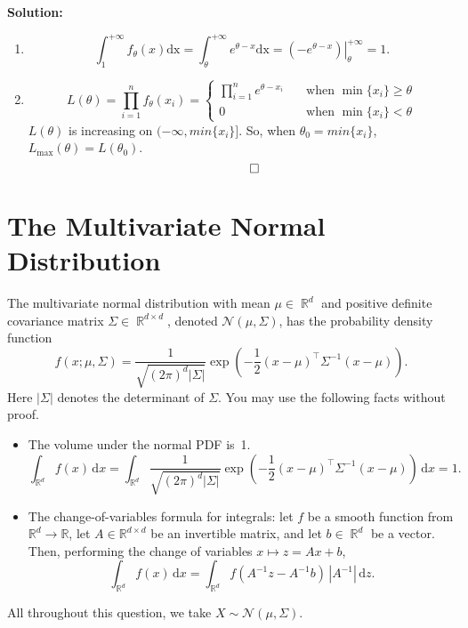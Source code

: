 \documentclass{article}
\newcommand{\Question}[1]{\Large \section{ #1 } \normalsize}
\DeclareMathOperator{\R}{\mathbb{R}}
\newenvironment{solution}{\color{blue} \smallskip \textbf{Solution:}}{}
\begin{document}
\begin{enumerate}
    \begin{solution}
        \begin{enumerate}
            \item 
            $$
            \int_{1}^{+\infty} f_{\theta}(x) \mathrm{dx} = \int_{\theta}^{+\infty} e^{\theta - x} \mathrm{dx} = \left. (-e^{\theta - x}) \right| _{\theta}^{+\infty}=1.
            $$
            \item
            $$
            L(\theta) =  \prod_{i=1}^n f_{\theta}(x_i) = \begin{cases} 
                \prod_{i=1}^n e^{\theta - x_i} \quad &\text{when } \min\{x_i\} \geq \theta \\
                0 \quad &\text{when } \min\{x_i\} < \theta
            \end{cases}
            $$
            $L(\theta)$ is increasing on $(-\infty, min\{x_i\}]$. So, when $\theta_0 = min\{x_i\}$, $L_{\max}(\theta) = L(\theta_0)$.
            \[ \qedhere \]
        \end{enumerate}
    \end{solution}

\end{enumerate}

\newpage
\Question{The Multivariate Normal Distribution}

The multivariate normal distribution with mean $\mu \in \R^d$ and positive definite covariance matrix $\Sigma \in \R^{d\times d}$, denoted $\mathcal{N}(\mu, \Sigma)$, has the probability density function
\[
    f(x; \mu, \Sigma) = \frac{1}{\sqrt{(2\pi)^d|\Sigma|}} \exp\left(-\frac{1}{2} (x - \mu)^\top \Sigma^{-1} (x - \mu)\right).
\]
Here $|\Sigma|$ denotes the determinant of $\Sigma$. 
You may use the following facts without proof.
\begin{itemize}
    \item 
    The volume under the normal PDF is~1.
    \[
        \int_{\R^d} f(x)\,\mathrm dx = \int_{\R^d} \frac{1}{\sqrt{(2\pi)^d|\Sigma|}} \exp\left(-\frac{1}{2} (x - \mu)^\top \Sigma^{-1} (x - \mu)\right)\,\mathrm dx = 1.
    \]
    \item 
    The change-of-variables formula for integrals: let $f$ be a smooth function from $\mathbb R^d \to \mathbb R$,  let $A\in\mathbb R^{d \times d}$ be an invertible matrix, and let $b \in \R^d$ be a vector. 
    Then, performing the change of variables $x \mapsto z = Ax + b$,  
    \[
        \int_{\R^d} f(x)\, \mathrm dx = \int_{\R^d} f(A^{-1}z - A^{-1}b)\, |A^{-1}| \,\mathrm dz.
    \]
\end{itemize}
All throughout this question, we take $X \sim \mathcal{N}(\mu, \Sigma)$.
\end{document}
